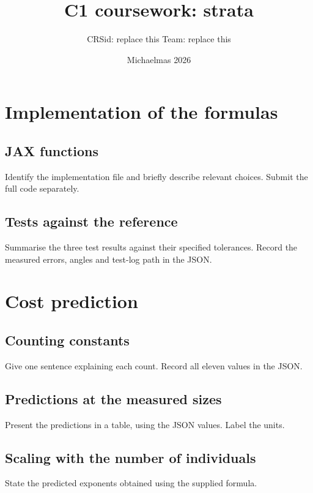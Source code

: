 \documentclass[11pt,a4paper]{article}
\title{C1 coursework: strata}
\author{CRSid: replace this \qquad Team: replace this}
\date{Michaelmas 2026}
\begin{document}
\maketitle


\section{Implementation of the formulas}
\subsection{JAX functions}
Identify the implementation file and briefly describe relevant choices.
Submit the full code separately.

\subsection{Tests against the reference}
Summarise the three test results against their specified tolerances.
Record the measured errors, angles and test-log path in the JSON.

\section{Cost prediction}
\subsection{Counting constants}
Give one sentence explaining each count. Record all eleven values in the JSON.

\subsection{Predictions at the measured sizes}
Present the predictions in a table, using the JSON values. Label the units.

\subsection{Scaling with the number of individuals}
State the predicted exponents obtained using the supplied formula.
\end{document}
